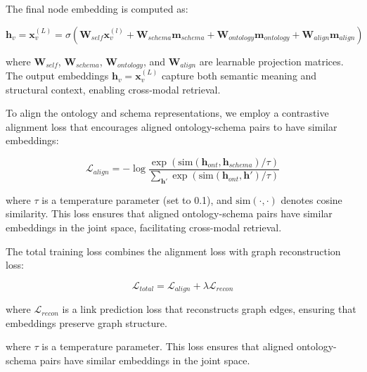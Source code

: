 \documentclass[sigconf, nonatbib]{acmart}
\begin{document}
The final node embedding is computed as:

\begin{equation}
    \mathbf{h}_v = \mathbf{x}_v^{(L)} = \sigma\left(\mathbf{W}_{self}\mathbf{x}_v^{(l)} + \mathbf{W}_{schema}\mathbf{m}_{schema} + \mathbf{W}_{ontology}\mathbf{m}_{ontology} + \mathbf{W}_{align}\mathbf{m}_{align}\right)
\end{equation}

where $\mathbf{W}_{self}$, $\mathbf{W}_{schema}$, $\mathbf{W}_{ontology}$, and $\mathbf{W}_{align}$ are learnable projection matrices. The output embeddings $\mathbf{h}_v = \mathbf{x}_v^{(L)}$ capture both semantic meaning and structural context, enabling cross-modal retrieval.

To align the ontology and schema representations, we employ a contrastive alignment loss that encourages aligned ontology-schema pairs to have similar embeddings:

\begin{equation}
    \mathcal{L}_{align} = -\log \frac{\exp(\text{sim}(\mathbf{h}_{ont}, \mathbf{h}_{schema})/\tau)}{\sum_{\mathbf{h}'} \exp(\text{sim}(\mathbf{h}_{ont}, \mathbf{h}')/\tau)}
\end{equation}

where $\tau$ is a temperature parameter (set to 0.1), and $\text{sim}(\cdot, \cdot)$ denotes cosine similarity. This loss ensures that aligned ontology-schema pairs have similar embeddings in the joint space, facilitating cross-modal retrieval.

The total training loss combines the alignment loss with graph reconstruction loss:

\begin{equation}
    \mathcal{L}_{total} = \mathcal{L}_{align} + \lambda \mathcal{L}_{recon}
\end{equation}

where $\mathcal{L}_{recon}$ is a link prediction loss that reconstructs graph edges, ensuring that embeddings preserve graph structure.

where $\tau$ is a temperature parameter. This loss ensures that aligned ontology-schema pairs have similar embeddings in the joint space.
\end{document}
